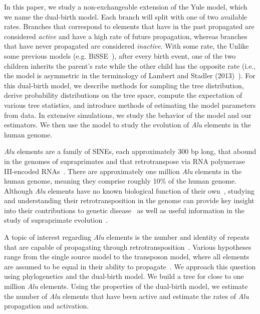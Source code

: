 In this paper, we study a non-exchangeable extension of the Yule model, which we name the dual-birth model. Each branch will split with one of two available rates. Branches that correspond to elements that have in the past propagated are considered \textit{active} and have a high rate of future propagation, whereas  branches that have never propagated are considered \textit{inactive}. With some rate, the Unlike some previous models (e.g. BiSSE~\cite{Maddison2007}), after every birth event, one of the two children inherits the parent's rate while the other child has the opposite rate (i.e., the model is asymmetric in the terminology of Lambert and Stadler (2013)~\cite{Lambert2013}). For this dual-birth  model, we describe methods for sampling the tree distribution, derive probability distributions on the tree space, compute the expectation of various tree statistics, and introduce methods of estimating the model parameters from data. In extensive simulations, we study the behavior of the model and our estimators. We then use the model to study the evolution of \textit{Alu} elements in the human genome.

\textit{Alu} elements are a family of \glspl{SINE}, each approximately 300 \gls{bp} long, that abound in the genomes of supraprimates and that retrotranspose via \gls{RNA} polymerase III-encoded \glspl{RNA}~\cite{Dewannieux2003}. There are approximately one million \textit{Alu} elements in the human genome, meaning they comprise roughly 10\% of the human genome. Although \textit{Alu} elements have no known biological function of their own~\cite{Schmid2003}, studying and understanding their retrotransposition in the genome can provide key insight into their contributions to genetic disease~\cite{Deininger1999} as well as useful information in the study of supraprimate evolution~\cite{Stoneking1997,Singer2003,Watkins2003}.

A topic of interest regarding \textit{Alu} elements is the number and identity of repeats that are capable of propagating through retrotransposition~\cite{Cordaux2004,Liu2009,Konkel2015}. Various hypotheses range from the single source model to the transposon model, where all elements are assumed to be equal in their ability to propagate~\cite{Cordaux2004}. We approach this question using phylogenetics and the dual-birth model. We build a tree for close to one million \textit{Alu} elements. Using the properties of the dual-birth model, we estimate the number of \textit{Alu} elements that have been active and estimate the rates of \textit{Alu} propagation and activation.

